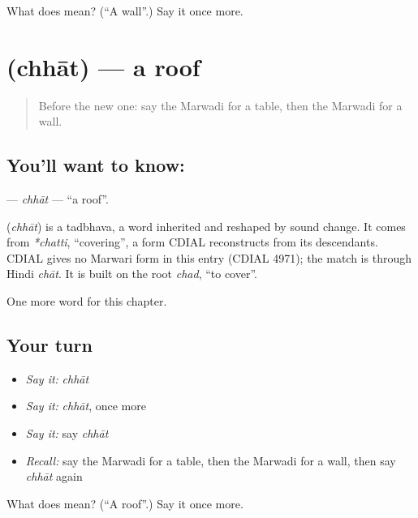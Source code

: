 \begin{tcolorbox}[breakable,colback=teal!4,colframe=teal!35!black,title={Before you move on}]
What does  mean? (\textquotedblleft{}A wall\textquotedblright{}.) Say it once more.
\end{tcolorbox}
\section[\texorpdfstring{\mw{छात} (chhāt)}{छात (chhāt)}]{ (chhāt) — a roof}

\label{lesson:MW-C62-chhat}



\begin{quote}
Before the new one: say the Marwadi for a table, then the Marwadi for a wall.
\end{quote}

\subsection*{You'll want to know: }
\textbf{} — \emph{chhāt} — \textquotedblleft{}a roof\textquotedblright{}.

\begin{cousinweb}
\textbf{} (\emph{chhāt}) is a tadbhava, a word inherited and reshaped by sound change. It comes from \emph{*chatti}, \textquotedblleft{}covering\textquotedblright{}, a form CDIAL reconstructs from its descendants. CDIAL gives no Marwari form in this entry (CDIAL 4971); the match is through Hindi \emph{chāt}. It is built on the root \emph{chad}, \textquotedblleft{}to cover\textquotedblright{}.
\end{cousinweb}

\begin{grammarlens}[title={What you've built}]
One more word for this chapter.
\end{grammarlens}

\subsection*{Your turn}
\begin{itemize}
\raggedright
  \item \emph{Say it:} \emph{chhāt}
  \item \emph{Say it:} \emph{chhāt}, once more
  \item \emph{Say it:} say \emph{chhāt}
  \item \emph{Recall:} say the Marwadi for a table, then the Marwadi for a wall, then say \emph{chhāt} again
\end{itemize}

\begin{tcolorbox}[breakable,colback=teal!4,colframe=teal!35!black,title={Before you move on}]
What does  mean? (\textquotedblleft{}A roof\textquotedblright{}.) Say it once more.
\end{tcolorbox}
